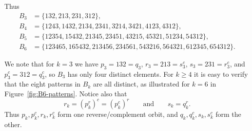 \documentclass[11pt]{amsart}
\theoremstyle{plain}
\theoremstyle{definition}
\theoremstyle{remark}
\begin{document}
Thus
\begin{align*}
  B_3 & = \{132,213,231,312\},                                         \\
  B_4 & = \{1243,1432,2134,2341,3214,3421,4123,4312\},                 \\
  B_5 & = \{12354,15432,21345,23451,43215,45321,51234,54312\},         \\
  B_6 & = \{123465,165432,213456,234561,543216,564321,612345,654312\}.
\end{align*}

We note that for $k=3$ we have
$p_3 = 132 = q_3$,
$r_3 = 213 = s_3^c$,
$s_3 = 231 = r_3^c$, and
$p_3^c = 312 = q_3^c$,
so $B_3$ has only four distinct elements.  For $k \geq 4$ it is easy to verify
that the eight patterns in $B_k$ are all distinct, as illustrated for $k=6$ in Figure~\ref{fig:B6-patterns}.
Notice also that
\[
  r_k=(p_k^r)^c=(p_k^c)^r
  \qquad\text{and}\qquad
  s_k=q_k^r.
\]
Thus $p_k,p_k^c,r_k,r_k^c$ form one reverse/complement orbit, and
$q_k,q_k^c,s_k,s_k^c$ form the other.
\end{document}
